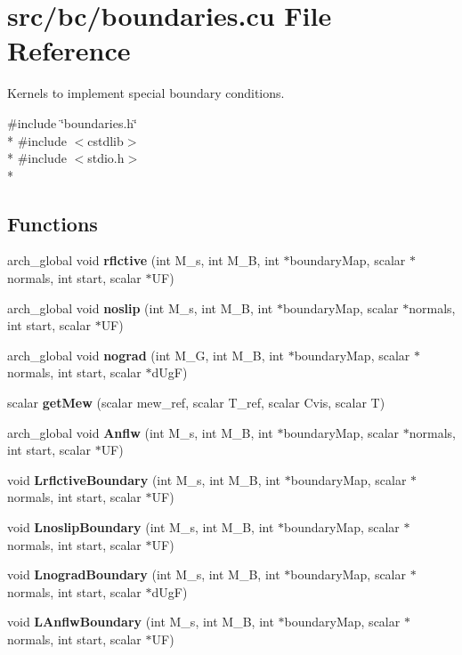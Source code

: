 \section{src/bc/boundaries.cu File Reference}
\label{boundaries_8cu}


Kernels to implement special boundary conditions.  


{\ttfamily \#include \char`\"{}boundaries.\-h\char`\"{}}\\*
{\ttfamily \#include $<$cstdlib$>$}\\*
{\ttfamily \#include $<$stdio.\-h$>$}\\*
\subsection*{Functions}
\begin{DoxyCompactItemize}
\item 
arch\-\_\-global void {\bf rflctive} (int M\-\_\-s, int M\-\_\-\-B, int $\ast$boundary\-Map, scalar $\ast$normals, int start, scalar $\ast$U\-F)
\item 
arch\-\_\-global void {\bf noslip} (int M\-\_\-s, int M\-\_\-\-B, int $\ast$boundary\-Map, scalar $\ast$normals, int start, scalar $\ast$U\-F)
\item 
arch\-\_\-global void {\bf nograd} (int M\-\_\-\-G, int M\-\_\-\-B, int $\ast$boundary\-Map, scalar $\ast$normals, int start, scalar $\ast$d\-Ug\-F)
\item 
scalar {\bfseries get\-Mew} (scalar mew\-\_\-ref, scalar T\-\_\-ref, scalar Cvis, scalar T)\label{boundaries_8cu_ac48429583cb7094b338db866283fa0a1}

\item 
arch\-\_\-global void {\bf Anflw} (int M\-\_\-s, int M\-\_\-\-B, int $\ast$boundary\-Map, scalar $\ast$normals, int start, scalar $\ast$U\-F)
\item 
void {\bf Lrflctive\-Boundary} (int M\-\_\-s, int M\-\_\-\-B, int $\ast$boundary\-Map, scalar $\ast$normals, int start, scalar $\ast$U\-F)
\item 
void {\bf Lnoslip\-Boundary} (int M\-\_\-s, int M\-\_\-\-B, int $\ast$boundary\-Map, scalar $\ast$normals, int start, scalar $\ast$U\-F)
\item 
void {\bf Lnograd\-Boundary} (int M\-\_\-s, int M\-\_\-\-B, int $\ast$boundary\-Map, scalar $\ast$normals, int start, scalar $\ast$d\-Ug\-F)
\item 
void {\bf L\-Anflw\-Boundary} (int M\-\_\-s, int M\-\_\-\-B, int $\ast$boundary\-Map, scalar $\ast$normals, int start, scalar $\ast$U\-F)
\end{DoxyCompactItemize}


